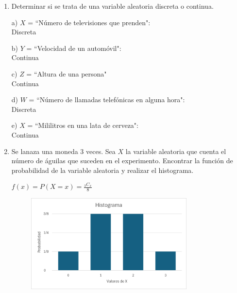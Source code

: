\documentclass[a4paper, 12pt]{article}
\newcommand{\Pspace}{0.5cm}
\newcommand{\Aspace}{0.2cm}
\begin{document}
    \begin{enumerate}
        \item Determinar si se trata de una variable aleatoria discreta o continua.
            \vspace{\Aspace} \par
            a) $X$ = ``Número de televisiones que prenden":
            \\ { \color{azul} Discreta }

            \vspace{\Aspace} \par
            b) $Y$ = ``Velocidad de un automóvil":
            \\ { \color{azul} Continua }

            \vspace{\Aspace} \par
            c) $Z$ = ``Altura de una persona"
            \\ { \color{azul} Continua }

            \vspace{\Aspace} \par
            d) $W$ = ``Número de llamadas telefónicas en alguna hora":
            \\ { \color{azul} Discreta }

            \vspace{\Aspace} \par
            e) $X$ = ``Mililitros en una lata de cerveza":
            \\ { \color{azul} Continua }


            \newpage
            \vspace{\Pspace}
        \item Se lanaza una moneda 3 veces. Sea $X$ la variable aleatoria que cuenta el número de águilas que suceden en el experimento. Encontrar la función de probabilidad de la variable aleatoria y realizar el histograma.
            \vspace{\Aspace} \par
            { \color{azul} $f(x) = P(X = x) = \frac{_{3}C_{x}}{8}$ }
            \begin{figure}[h]
                \vspace{\Aspace}
                \centering
                \includegraphics[width=0.8\textwidth]{./Assets/HistogramaT5P2.png}
            \end{figure}
    \end{enumerate}
\end{document}
